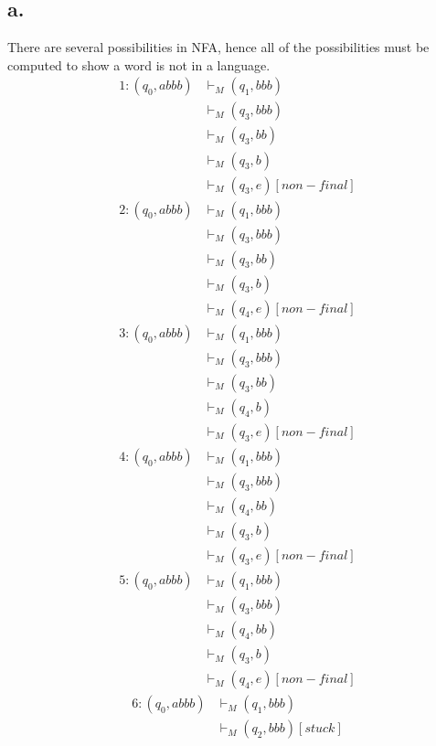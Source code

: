 \documentclass[12pt]{article}
\begin{document}
\subsection*{a.}
There are several possibilities in NFA, hence all of the possibilities must be computed to show a word is not in a language.
\begin{align*}
   1: (q_0, abbb) & \vdash_M (q_1, bbb) \\
   & \vdash_M (q_3, bbb) \\
   & \vdash_M (q_3, bb)\\
   & \vdash_M (q_3, b)\\
   & \vdash_M (q_3, e) [non-final]
\end{align*}
\begin{align*}
   2: (q_0, abbb) & \vdash_M (q_1, bbb) \\
   & \vdash_M (q_3, bbb) \\
   & \vdash_M (q_3, bb)\\
   & \vdash_M (q_3, b)\\
   & \vdash_M (q_4, e) [non-final]
\end{align*}
\begin{align*}
   3: (q_0, abbb) & \vdash_M (q_1, bbb) \\
   & \vdash_M (q_3, bbb) \\
   & \vdash_M (q_3, bb)\\
   & \vdash_M (q_4, b)\\
   & \vdash_M (q_3, e) [non-final]
\end{align*}
\begin{align*}
   4: (q_0, abbb) & \vdash_M (q_1, bbb) \\
   & \vdash_M (q_3, bbb) \\
   & \vdash_M (q_4, bb)\\
   & \vdash_M (q_3, b)\\
   & \vdash_M (q_3, e) [non-final]
\end{align*}
\begin{align*}
   5: (q_0, abbb) & \vdash_M (q_1, bbb) \\
   & \vdash_M (q_3, bbb) \\
   & \vdash_M (q_4, bb)\\
   & \vdash_M (q_3, b)\\
   & \vdash_M (q_4, e) [non-final]
\end{align*}
\begin{align*}
   6: (q_0, abbb) & \vdash_M (q_1, bbb) \\
   & \vdash_M (q_2, bbb) [stuck]
\end{align*}
\end{document}
